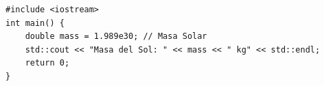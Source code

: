 \documentclass{beamer}
\begin{document}
\begin{frame}[fragile]
\begin{verbatim}
#include <iostream>
int main() {
    double mass = 1.989e30; // Masa Solar
    std::cout << "Masa del Sol: " << mass << " kg" << std::endl;
    return 0;
}
\end{verbatim}
\end{frame}
\end{document}
